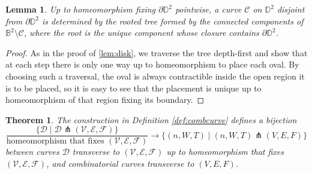 \documentclass[11pt,reqno]{amsart}
\theoremstyle{plain}
\newtheorem{theorem}[subsection]{Theorem}
\newtheorem{lemma}[subsection]{Lemma}
\theoremstyle{definition}
\theoremstyle{remark}
\numberwithin{equation}{subsection}
\newcommand*{\bbB}{\mathbb{B}}
\newcommand*{\bbD}{\mathbb{D}}
\newcommand*{\calC}{\mathcal{C}}
\newcommand*{\calD}{\mathcal{D}}
\newcommand*{\calE}{\mathcal{E}}
\newcommand*{\calF}{\mathcal{F}}
\newcommand*{\calV}{\mathcal{V}}
\begin{document}
\begin{lemma}\label{lem:float}
    Up to homeomorphism fixing $\partial\bbD^2$ pointwise, a curve $\calC$ on $\bbD^2$ disjoint from $\partial\bbD^2$ is determined by the rooted tree formed by the connected components of $\bbB^2\setminus\calC$, where the root is the unique component whose closure contains $\partial\bbD^2$.
\end{lemma}
\begin{proof}
    As in the proof of \ref{lem:disk}, we traverse the tree depth-first and show that at each step there is only one way up to homeomorphism to place each oval. By choosing such a traversal, the oval is always contractible inside the open region it is to be placed, so it is easy to see that the placement is unique up to homeomorphism of that region fixing its boundary.
\end{proof}

\begin{theorem}\label{thm:main}
    The construction in Definition \ref{def:combcurve} defines a bijection
    \begin{equation}\label{eq:main}
        \frac{\{\calD\mid\calD\pitchfork(\calV,\calE,\calF)\}}{\text{homeomorphism that fixes $(\calV,\calE,\calF)$}}\to\{(n,W,T)\mid(n,W,T)\pitchfork(V,E,F)\}
    \end{equation}
    between curves $\calD$ transverse to $(\calV,\calE,\calF)$ up to homeomorphism that fixes $(\calV,\calE,\calF)$, and combinatorial curves transverse to $(V,E,F)$.
\end{theorem}
\end{document}

